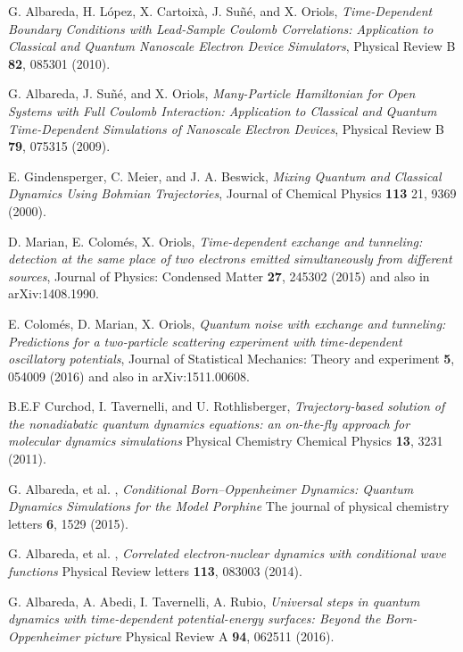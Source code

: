 \documentclass[nofootinbib, secnumarabic, amsmath, nobibnotes,10pt,aps,pra]{revtex4-1}
\begin{document}
\begin{thebibliography}{999}
G. Albareda, H. L\'{o}pez, X. Cartoix\`{a}, J.  Su\~{n}\'{e}, and X.
Oriols, \emph{Time-Dependent Boundary Conditions with Lead-Sample
Coulomb  Correlations: Application to Classical and Quantum
Nanoscale Electron Device Simulators}, Physical Review B \textbf{82},  085301 (2010).

G. Albareda, J. Su\~{n}\'{e}, and X. Oriols, \emph{Many-Particle Hamiltonian for Open Systems with Full Coulomb Interaction: Application to Classical and Quantum Time-Dependent Simulations of Nanoscale Electron Devices}, Physical Review B \textbf{79},  075315 (2009).

E. Gindensperger, C. Meier, and J. A. Beswick, \emph{Mixing Quantum and Classical Dynamics Using Bohmian Trajectories}, Journal of Chemical Physics \textbf{113} 21,  9369 (2000).

 D. Marian, E. Colom\'{e}s, X. Oriols, \emph{Time-dependent exchange and tunneling: detection at the same place of two electrons emitted simultaneously from different sources},  Journal of Physics: Condensed Matter  {\bf 27},  245302 (2015) and also in arXiv:1408.1990.  

E. Colom\'{e}s, D. Marian, X. Oriols, \emph{Quantum noise with exchange and tunneling: Predictions for a two-particle scattering experiment with time-dependent oscillatory potentials}, Journal of Statistical Mechanics: Theory and experiment {\bf 5},  054009 (2016) and also in arXiv:1511.00608.  


B.E.F Curchod, I. Tavernelli, and U. Rothlisberger, \emph{Trajectory-based solution of the nonadiabatic quantum dynamics equations: an on-the-fly approach for molecular dynamics simulations} Physical Chemistry Chemical Physics \textbf{13},  3231 (2011).

G. Albareda, et al. , \emph{Conditional Born–Oppenheimer Dynamics: Quantum Dynamics Simulations for the Model Porphine} The journal of physical chemistry letters \textbf{6},  1529 (2015).

G. Albareda, et al. , \emph{Correlated electron-nuclear dynamics with conditional wave functions} Physical Review letters \textbf{113},  083003 (2014).

G. Albareda, A. Abedi, I. Tavernelli, A. Rubio, \emph{Universal steps in quantum dynamics with time-dependent potential-energy surfaces: Beyond the Born-Oppenheimer picture} Physical Review A \textbf{94},  062511 (2016).


\end{thebibliography}
\end{document}
